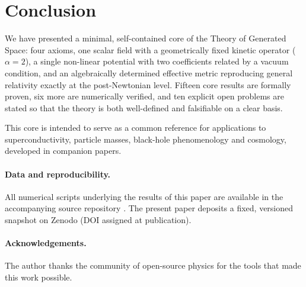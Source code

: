 \documentclass[11pt,a4paper]{article}
\begin{document}
\section{Conclusion}\label{sec:conclusion}

We have presented a minimal, self-contained core of the Theory of Generated
Space: four axioms, one scalar field with a geometrically fixed kinetic
operator ($\alpha=2$), a single non-linear potential with two coefficients
related by a vacuum condition, and an algebraically determined effective
metric reproducing general relativity exactly at the post-Newtonian level.
Fifteen core results are formally proven, six more are numerically
verified, and ten explicit open problems are stated so that the theory is
both well-defined and falsifiable on a clear basis.

This core is intended to serve as a common reference for applications to
superconductivity, particle masses, black-hole phenomenology and cosmology,
developed in companion papers.

\paragraph{Data and reproducibility.} All numerical scripts underlying the
results of this paper are available in the accompanying source repository
\cite{TGP-repo}. The present paper deposits a fixed, versioned snapshot on
Zenodo (DOI assigned at publication).

\paragraph{Acknowledgements.} The author thanks the community of
open-source physics for the tools that made this work possible.
\end{document}
